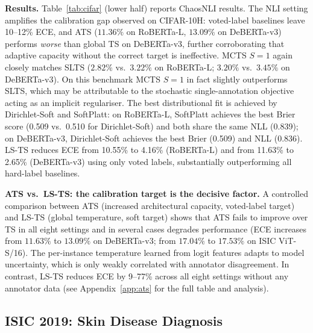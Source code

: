 \documentclass[10pt,journal,compsoc]{IEEEtran}
\begin{document}
\noindent\textbf{Results.}
Table~\ref{tab:cifar} (lower half) reports ChaosNLI results.  The NLI setting amplifies the calibration gap observed on CIFAR-10H: voted-label baselines leave 10--12\% ECE, and ATS ($11.36\%$ on RoBERTa-L, $13.09\%$ on DeBERTa-v3) performs \emph{worse} than global TS on DeBERTa-v3, further corroborating that adaptive capacity without the correct target is ineffective.  MCTS $S{=}1$ again closely matches SLTS ($2.82\%$ vs.\ $3.22\%$ on RoBERTa-L; $3.20\%$ vs.\ $3.45\%$ on DeBERTa-v3).  On this benchmark MCTS $S{=}1$ in fact slightly outperforms SLTS, which may be attributable to the stochastic single-annotation objective acting as an implicit regulariser.  The best distributional fit is achieved by Dirichlet-Soft and SoftPlatt: on RoBERTa-L, SoftPlatt achieves the best Brier score (0.509 vs.\ 0.510 for Dirichlet-Soft) and both share the same NLL (0.839); on DeBERTa-v3, Dirichlet-Soft achieves the best Brier (0.509) and NLL (0.836).  LS-TS reduces ECE from 10.55\% to 4.16\% (RoBERTa-L) and from 11.63\% to 2.65\% (DeBERTa-v3) using only voted labels, substantially outperforming all hard-label baselines.

\noindent\textbf{ATS vs.\ LS-TS: the calibration target is the decisive factor.}
A controlled comparison between ATS (increased architectural capacity, voted-label target) and LS-TS (global temperature, soft target) shows that ATS fails to improve over TS in all eight settings and in several cases degrades performance (ECE increases from $11.63\%$ to $13.09\%$ on DeBERTa-v3; from $17.04\%$ to $17.53\%$ on ISIC ViT-S/16).  The per-instance temperature learned from logit features adapts to model uncertainty, which is only weakly correlated with annotator disagreement.  In contrast, LS-TS reduces ECE by 9--77\% across all eight settings without any annotator data (see Appendix~\ref{app:ats} for the full table and analysis).

\subsection{ISIC 2019: Skin Disease Diagnosis}
\label{sec:isic2019}
\end{document}
